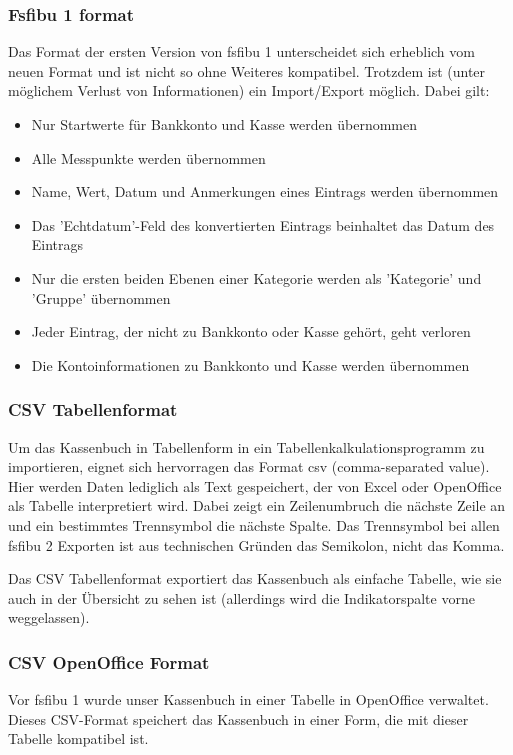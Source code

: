 \documentclass[a4paper,10pt,halfparskip,oneside,smallheadings]{scrbook}
\begin{document}
\subsubsection{Fsfibu 1 format}
Das Format der ersten Version von fsfibu 1 unterscheidet sich erheblich vom neuen Format und ist nicht so ohne Weiteres kompatibel. Trotzdem ist (unter möglichem Verlust von Informationen) ein Import/Export möglich. Dabei gilt:
\begin{itemize}
 \item Nur Startwerte für Bankkonto und Kasse werden übernommen
 \item Alle Messpunkte werden übernommen
 \item Name, Wert, Datum und Anmerkungen eines Eintrags werden übernommen
 \item Das 'Echtdatum'-Feld des konvertierten Eintrags beinhaltet das Datum des Eintrags
 \item Nur die ersten beiden Ebenen einer Kategorie werden als 'Kategorie' und 'Gruppe' übernommen
 \item Jeder Eintrag, der nicht zu Bankkonto oder Kasse gehört, geht verloren
 \item Die Kontoinformationen zu Bankkonto und Kasse werden übernommen
\end{itemize}
\subsubsection{CSV Tabellenformat}
Um das Kassenbuch in Tabellenform in ein Tabellenkalkulationsprogramm zu importieren, eignet sich hervorragen das Format csv (comma-separated value). Hier werden Daten lediglich als Text gespeichert, der von Excel oder OpenOffice als Tabelle interpretiert wird. Dabei zeigt ein Zeilenumbruch die nächste Zeile an und ein bestimmtes Trennsymbol die nächste Spalte. Das Trennsymbol bei allen fsfibu 2 Exporten ist aus technischen Gründen das Semikolon, nicht das Komma.

Das CSV Tabellenformat exportiert das Kassenbuch als einfache Tabelle, wie sie auch in der Übersicht zu sehen ist (allerdings wird die Indikatorspalte vorne weggelassen).
\subsubsection{CSV OpenOffice Format}
Vor fsfibu 1 wurde unser Kassenbuch in einer Tabelle in OpenOffice verwaltet. Dieses CSV-Format speichert das Kassenbuch in einer Form, die mit dieser Tabelle kompatibel ist.
\end{document}

